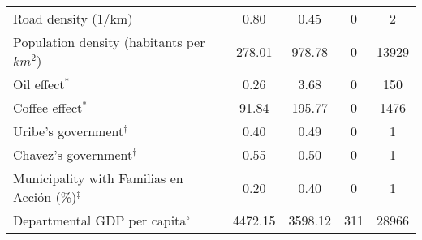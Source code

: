 \documentclass[a4paper,10pt,twocolumn,preprint,3p,authoryear]{elsarticle}
\begin{document}
\begin{appendix}
\begin{table*}[h]
\begin{tabular}{L{6cm} cccc}
Road density (1/km) &        0.80&        0.45&           0&           2\\
Population density (habitants per $km^{2}$)  &      278.01&      978.78&           0&       13929\\
Oil effect$^{*}$   &        0.26&        3.68&           0&         150\\
Coffee effect$^{*}$&       91.84&      195.77&           0&        1476\\
Uribe's government$^{\dagger}$      &        0.40&        0.49&           0&           1\\
Chavez's government$^{\dagger}$ &        0.55&        0.50&           0&           1\\
Municipality with Familias en Acci\'on (\%)$^{\ddagger}$&        0.20&        0.40&           0&           1\\
Departmental GDP per capita$^{\circ}$   &     4472.15&     3598.12&         311&       28966\\
\hline
\end{tabular}\\ 
\begin{minipage}[t]{1\columnwidth}%
		 \begin{spacing}{1}
		  \end{spacing}
	  \end{minipage}

	\label{tab:MunControlDesc}
\end{table*}


\end{appendix}
\end{document}
